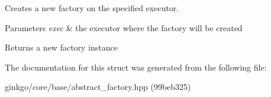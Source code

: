 Creates a new factory on the specified executor. 


\begin{DoxyParams}{Parameters}
{\em exec} & the executor where the factory will be created\\
\hline
\end{DoxyParams}
\begin{DoxyReturn}{Returns}
a new factory instance 
\end{DoxyReturn}


The documentation for this struct was generated from the following file\+:\begin{DoxyCompactItemize}
\item 
ginkgo/core/base/abstract\+\_\+factory.\+hpp (99beb325)\end{DoxyCompactItemize}

